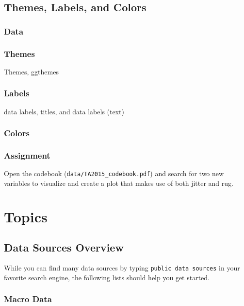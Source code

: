 \documentclass[]{book}
\theoremstyle{definition}
\theoremstyle{definition}
\theoremstyle{remark}
\begin{document}
\hypertarget{themes-labels-colors}{\chapter{Themes, Labels, and
Colors}\label{themes-labels-colors}}

\section{Data}\label{data-7}

\section{Themes}\label{themes}

Themes, ggthemes

\section{Labels}\label{labels}

data labels, titles, and data labels (text)

\section{Colors}\label{colors}

\section{Assignment}\label{assignment-4}

Open the codebook (\texttt{data/TA2015\_codebook.pdf}) and search for
two new variables to visualize and create a plot that makes use of both
jitter and rug.

\part{Topics}\label{part-topics}

\hypertarget{data-sources}{\chapter*{Data Sources
Overview}\label{data-sources}}

While you can find many data sources by typing
\texttt{public\ data\ sources} in your favorite search engine, the
following lists should help you get started.

\section*{Macro Data}\label{macro-data}
\end{document}
